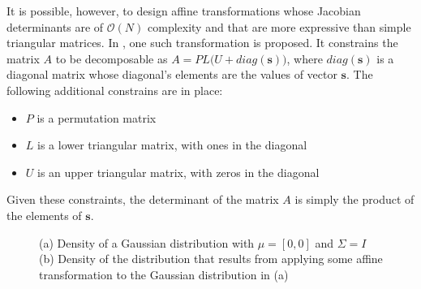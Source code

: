 It is possible, however, to design affine transformations whose Jacobian determinants
are of $\mathcal{O}(N)$ complexity and that are more expressive than simple
triangular matrices. In \autocite{Glow}, one such transformation is proposed. It
constrains the matrix $A$ to be decomposable as $A = PL\big(U + diag(\bm{s})\big)$,
where $diag(\bm{s})$ is a diagonal matrix whose diagonal's elements are
the values of vector $\bm{s}$. The following additional constrains are in place:
\begin{itemize}
    \item $P$ is a permutation matrix
    \item $L$ is a lower triangular matrix, with ones in the diagonal
    \item $U$ is an upper triangular matrix, with zeros in the diagonal
\end{itemize}
Given these constraints, the determinant of the matrix $A$ is simply the product
of the elements of $\bm{s}$.

\begin{figure}[!htb]
  \begin{subfigmatrix}{2}
  \end{subfigmatrix}
    \caption{(a) Density of a Gaussian distribution with $\mu = [0, 0]$ and $\Sigma = I$
    (b) Density of the distribution that results from applying some affine transformation to
    the Gaussian distribution in (a)
    }
  \label{fig:affine}
\end{figure}

